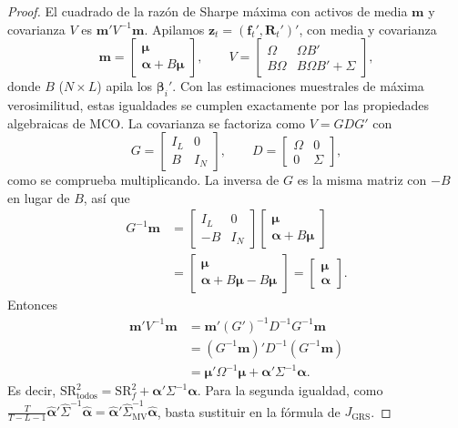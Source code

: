 \begin{proof}
El cuadrado de la razón de Sharpe máxima con activos de media $\mathbf m$ y covarianza $V$ es $\mathbf m'V^{-1}\mathbf m$.
Apilamos $\mathbf z_t=(\mathbf f_t',\mathbf R_t')'$, con media y covarianza
\[
  \mathbf m=\begin{bmatrix}\boldsymbol\mu\\ \boldsymbol\alpha+B\boldsymbol\mu\end{bmatrix},\qquad
  V=\begin{bmatrix}\Omega & \Omega B'\\ B\Omega & B\Omega B'+\Sigma\end{bmatrix},
\]
donde $B$ ($N\times L$) apila los $\boldsymbol\beta_i'$. Con las estimaciones muestrales de máxima verosimilitud, estas
igualdades se cumplen exactamente por las propiedades algebraicas de MCO. La covarianza se factoriza como $V=GDG'$ con
\[
  G=\begin{bmatrix}I_L & 0\\ B & I_N\end{bmatrix},\qquad D=\begin{bmatrix}\Omega & 0\\ 0 & \Sigma\end{bmatrix},
\]
como se comprueba multiplicando. La inversa de $G$ es la misma matriz con $-B$ en lugar de $B$, así que
\begin{align*}
  G^{-1}\mathbf m &= \begin{bmatrix}I_L & 0\\ -B & I_N\end{bmatrix}\begin{bmatrix}\boldsymbol\mu\\ \boldsymbol\alpha+B\boldsymbol\mu\end{bmatrix}\\
                  &= \begin{bmatrix}\boldsymbol\mu\\ \boldsymbol\alpha+B\boldsymbol\mu-B\boldsymbol\mu\end{bmatrix}
                   = \begin{bmatrix}\boldsymbol\mu\\ \boldsymbol\alpha\end{bmatrix}.
\end{align*}
Entonces
\begin{align*}
  \mathbf m'V^{-1}\mathbf m &= \mathbf m'(G')^{-1}D^{-1}G^{-1}\mathbf m\\
                            &= (G^{-1}\mathbf m)'D^{-1}(G^{-1}\mathbf m)\\
                            &= \boldsymbol\mu'\Omega^{-1}\boldsymbol\mu+\boldsymbol\alpha'\Sigma^{-1}\boldsymbol\alpha .
\end{align*}
Es decir, $\mathrm{SR}^2_{\text{todos}}=\mathrm{SR}^2_f+\boldsymbol\alpha'\Sigma^{-1}\boldsymbol\alpha$. Para la segunda igualdad, como
$\frac{T}{T-L-1}\hat{\boldsymbol\alpha}'\hat\Sigma^{-1}\hat{\boldsymbol\alpha}=\hat{\boldsymbol\alpha}'\hat\Sigma_{\text{MV}}^{-1}\hat{\boldsymbol\alpha}$, basta
sustituir en la fórmula de $J_{\text{GRS}}$.
\end{proof}

